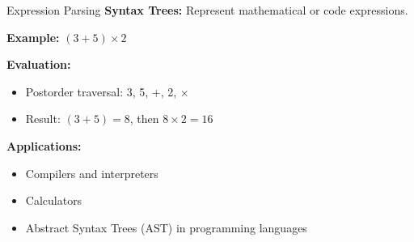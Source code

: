 \documentclass[aspectratio=169]{beamer}
\begin{document}
\begin{frame}{Expression Parsing}
  \textbf{Syntax Trees:} Represent mathematical or code expressions.

  \vspace{0.3cm}
  \textbf{Example:} $(3 + 5) \times 2$

  \begin{center}
  \end{center}

  \vspace{0.3cm}
  \textbf{Evaluation:}
  \begin{itemize}
    \item Postorder traversal: 3, 5, +, 2, $\times$
    \item Result: $(3 + 5) = 8$, then $8 \times 2 = 16$
  \end{itemize}

  \vspace{0.3cm}
  \textbf{Applications:}
  \begin{itemize}
    \item Compilers and interpreters
    \item Calculators
    \item Abstract Syntax Trees (AST) in programming languages
  \end{itemize}
\end{frame}
\end{document}
